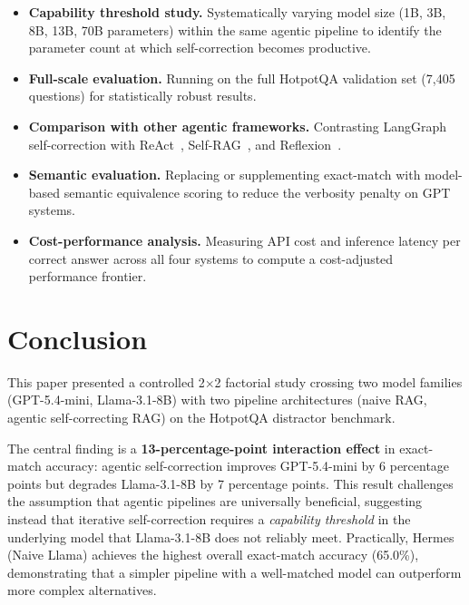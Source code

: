 \documentclass[12pt]{article}
\begin{document}
\begin{itemize}
    \item \textbf{Capability threshold study.}  Systematically varying model
          size (1B, 3B, 8B, 13B, 70B parameters) within the same agentic
          pipeline to identify the parameter count at which self-correction
          becomes productive.
    \item \textbf{Full-scale evaluation.}  Running on the full HotpotQA
          validation set (7{,}405 questions) for statistically robust results.
    \item \textbf{Comparison with other agentic frameworks.}  Contrasting
          LangGraph self-correction with ReAct~\cite{yao2022react},
          Self-RAG~\cite{asai2023selfrag}, and Reflexion~\cite{shinn2023reflexion}.
    \item \textbf{Semantic evaluation.}  Replacing or supplementing exact-match
          with model-based semantic equivalence scoring to reduce the verbosity
          penalty on GPT systems.
    \item \textbf{Cost-performance analysis.}  Measuring API cost and inference
          latency per correct answer across all four systems to compute a
          cost-adjusted performance frontier.
\end{itemize}

\section{Conclusion}

This paper presented a controlled 2$\times$2 factorial study crossing two
model families (GPT-5.4-mini, Llama-3.1-8B) with two pipeline architectures
(naive RAG, agentic self-correcting RAG) on the HotpotQA distractor benchmark.

The central finding is a \textbf{13-percentage-point interaction effect} in
exact-match accuracy: agentic self-correction improves GPT-5.4-mini by 6
percentage points but degrades Llama-3.1-8B by 7 percentage points.  This
result challenges the assumption that agentic pipelines are universally
beneficial, suggesting instead that iterative self-correction requires a
\emph{capability threshold} in the underlying model that Llama-3.1-8B does
not reliably meet.  Practically, Hermes (Naive Llama) achieves the highest
overall exact-match accuracy (65.0\%), demonstrating that a simpler pipeline
with a well-matched model can outperform more complex alternatives.
\end{document}
